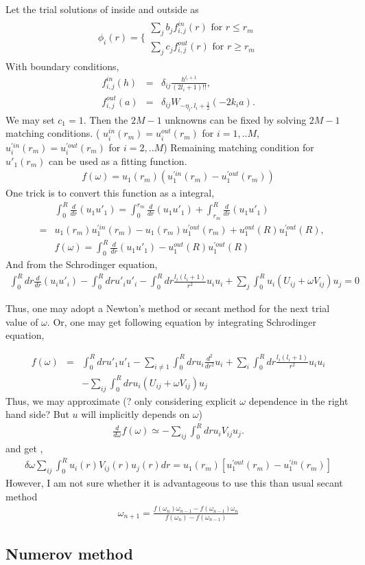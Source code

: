 \documentclass[10pt]{book}
\newcommand{\bea}{\begin{eqnarray}}
\newcommand{\eea}{\end{eqnarray}}
\newcommand{\no}{\nonumber \\}
\begin{document}
Let the trial solutions of inside and outside as
\bea 
\phi_i(r)=\Big\{ \begin{array}{ll} \sum_j b_j f_{i,j}^{in}(r) \mbox{ for } r\leq r_m \\ 
                          \sum_j c_j f_{i,j}^{out}(r) \mbox{ for } r\geq r_m
                    \end{array}
\eea 
With boundary conditions,
\bea 
f_{i,j}^{in}(h)&=&\delta_{ij} \frac{h^{l_i+1}}{(2l_i+1)!!},\no 
f_{i,j}^{out}(a)&=&\delta_{ij} W_{-\eta_i,l_i+\frac{1}{2}}(-2k_i a).
\eea 
We may set $c_1=1$.  Then the $2M-1$ unknowns can be fixed by 
solving $2M-1$ matching conditions. 
( $u^{in}_i(r_m)=u^{out}_i(r_m)$ for $i=1,..M$,  
  $u^{'in}_i(r_m)=u^{' out}_i(r_m)$ for $i=2,..M$)
Remaining matching condition for $u'_1(r_m)$
can be used as a fitting function. 
\bea 
f(\omega)=u_1(r_m)(u_1^{' in}(r_m)-u_1^{' out}(r_m))
\eea 
One trick is to convert this function as a integral,
\bea 
& &\int_{0}^{R} \frac{d}{dr}(u_1 u'_1)
 = \int_{0}^{r_m} \frac{d}{dr}(u_1 u'_1)+\int_{r_m}^{R} \frac{d}{dr}(u_1 u'_1) \no 
&=& u_1(r_m)u^{'in}_1(r_m)-u_1(r_m)u^{'out}_1(r_m)+u^{out}_1(R)u^{'out}_1(R),\no 
& & f(\omega)=\int_{0}^{R} \frac{d}{dr}(u_1 u'_1)-u^{out}_1(R)u^{'out}_1(R)
\eea 
And from the Schrodinger equation, 
\bea 
\int_{0}^R dr \frac{d}{dr} (u_i u'_i)
-\int_{0}^R dr u'_i u'_i- \int_{0}^R dr \frac{l_i(l_i+1)}{r^2} u_i u_i
+\sum_{j}\int_0^R u_i(U_{ij}+\omega V_{ij})u_j=0
\eea 


Thus, one may adopt a Newton's method or secant method for the next trial value of $\omega$.
Or, one may get following equation by integrating Schrodinger equation,


\bea 
f(\omega)
&=& \int_0^R dr u'_1 u'_1 -\sum_{i\neq 1}\int_0^R dr u_i\frac{d^2}{dr^2}u_i 
         +\sum_i \int_0^R dr\frac{l_i(l_i+1)}{r^2} u_i u_i \no & &
         -\sum_{ij}\int_0^R dr u_i(U_{ij}+\omega V_{ij})u_j   
\eea 
Thus, we may approximate (? only considering explicit $\omega$ dependence in the right hand side? 
But $u$ will implicitly depends on $\omega$)
\bea 
\frac{d}{d\omega} f(\omega)\simeq -\sum_{ij}\int_0^R dr u_i V_{ij}u_j.
\eea 
and get ,
\bea 
\delta\omega\sum_{ij}\int_0^R u_i(r)V_{ij}(r)u_j(r) dr =u_1(r_m)[u^{'out}_1(r_m)-u^{'in }_1(r_m)]
\eea 
However, I am not sure whether it is advantageous to use this than usual
secant method 
\bea 
\omega_{n+1}=\frac{f(\omega_{n})\omega_{n-1}-f(\omega_{n-1})\omega_{n}}
                  {f(\omega_n)-f(\omega_{n-1})}     
\eea 

\subsection{Numerov method}
\end{document}
